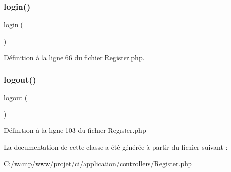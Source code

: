 \mbox{\label{class_register_aa311da27ba5706f5710cea7706c8eae1}} 
\subsubsection{\texorpdfstring{login()}{login()}}
{\footnotesize\ttfamily login (\begin{DoxyParamCaption}{ }\end{DoxyParamCaption})}



Définition à la ligne 66 du fichier Register.\+php.

\mbox{\label{class_register_a082405d89acd6835c3a7c7a08a7adbab}} 
\subsubsection{\texorpdfstring{logout()}{logout()}}
{\footnotesize\ttfamily logout (\begin{DoxyParamCaption}{ }\end{DoxyParamCaption})}



Définition à la ligne 103 du fichier Register.\+php.



La documentation de cette classe a été générée à partir du fichier suivant \+:\begin{DoxyCompactItemize}
\item 
C\+:/wamp/www/projet/ci/application/controllers/\mbox{\hyperlink{_register_8php}{Register.\+php}}\end{DoxyCompactItemize}
